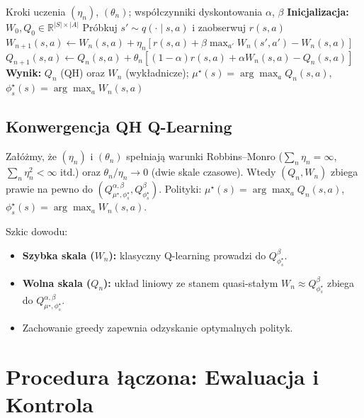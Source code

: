\begin{algorithm}[H]
\caption{QH Q-Learning (Model-Free)}
\label{alg:qh-qlearning}
\begin{algorithmic}[1]
\REQUIRE Kroki uczenia $(\eta_n)$, $(\theta_n)$; współczynniki dyskontowania $\alpha$, $\beta$
\STATE \textbf{Inicjalizacja:} $W_0, Q_0 \in \mathbb{R}^{|S| \times |A|}$
\STATE Próbkuj $s' \sim q(\cdot\mid s, a)$ i zaobserwuj $r(s, a)$
\STATE $W_{n+1}(s, a) \leftarrow W_n(s, a) + \eta_n \left[ r(s, a) + \beta \max_{a'} W_n(s', a') - W_n(s, a) \right]$
\STATE $Q_{n+1}(s, a) \leftarrow Q_n(s, a) + \theta_n \left[ (1 - \alpha) r(s, a) + \alpha W_n(s, a) - Q_n(s, a) \right]$
\ENDFOR
\ENDFOR
\STATE \textbf{Wynik:} $Q_n$ (QH) oraz $W_n$ (wykładnicze); $\mu^\star(s) = \arg\max_a Q_n(s, a)$, $\phi_s^\star(s) = \arg\max_a W_n(s, a)$
\end{algorithmic}
\end{algorithm}

\subsection{Konwergencja QH Q-Learning}

\begin{theorem}
\label{thm:qh-qlearning-conv}
Załóżmy, że $(\eta_n)$ i $(\theta_n)$ spełniają warunki Robbins--Monro ($\sum_n \eta_n = \infty$, $\sum_n \eta_n^2 < \infty$ itd.) oraz $\theta_n / \eta_n \to 0$ (dwie skale czasowe). Wtedy $(Q_n, W_n)$ zbiega prawie na pewno do $(Q^{\alpha, \beta}_{\mu^\star, \phi_s^\star}, Q^{\beta}_{\phi_s^\star})$. Polityki: $\mu^\star(s) = \arg\max_a Q_n(s,a)$, $\phi_s^\star(s) = \arg\max_a W_n(s,a)$.
\end{theorem}

Szkic dowodu:
\begin{itemize}
\item \textbf{Szybka skala ($W_n$):} klasyczny Q-learning prowadzi do $Q^{\beta}_{\phi_s^\star}$.
\item \textbf{Wolna skala ($Q_n$):} układ liniowy ze stanem quasi-stałym $W_n \approx Q^{\beta}_{\phi_s^\star}$ zbiega do $Q^{\alpha, \beta}_{\mu^\star, \phi_s^\star}$.
\item Zachowanie greedy zapewnia odzyskanie optymalnych polityk.
\end{itemize}

\section{Procedura łączona: Ewaluacja i Kontrola}

